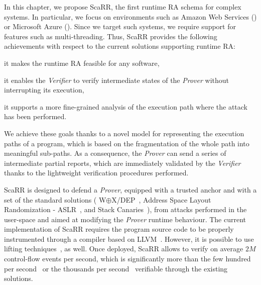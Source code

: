 In this chapter, we propose ScaRR, the first runtime RA schema for complex 
systems.
In particular, we focus on environments such as Amazon Web Services (\cite{aws})
or Microsoft Azure (\cite{azure}). 
Since we target such systems, we require support for features such as 
multi-threading.
Thus, ScaRR provides the following achievements with respect to the current 
solutions supporting runtime RA: 
\begin{enumerate*}[label=(\roman*)]
	\item it makes the runtime RA feasible for any software,
	\item it enables the \emph{Verifier} to verify intermediate states of the 
	\emph{Prover} without interrupting its execution,
	\item it supports a more fine-grained analysis of the execution path where 
	the attack has been performed. 
\end{enumerate*}
We achieve these goals thanks to a novel model for representing the execution 
paths of a program, which is based on the fragmentation of the whole path into 
meaningful sub-paths. As a consequence, the \emph{Prover} can send a series of 
intermediate partial reports, which are immediately validated by the 
\emph{Verifier} thanks to the lightweight verification procedures performed.  

ScaRR is designed to defend a \emph{Prover}, equipped with a trusted anchor and 
with a set of the standard solutions (\eg 
W$\oplus$X/DEP~\cite{pinzari2003introduction},
Address Space Layout Randomization - ASLR~\cite{kil2006address}, and Stack 
Canaries~\cite{baratloo2000transparent}), from attacks performed in the 
user-space and aimed at modifying the \emph{Prover} runtime behaviour. The 
current implementation of ScaRR requires the program source code to be properly 
instrumented through a compiler based on LLVM~\cite{lattner2004llvm}. However, 
it is possible to use lifting techniques~\cite{mcsema}, as well. 
Once deployed, ScaRR allows to verify on average $2M$ control-flow events per 
second, which is significantly more than the few hundred 
per second~\cite{Dessouky:2018:LLH:3240765.3240821} or the thousands per 
second~\cite{aberadiat} verifiable through the existing solutions.

